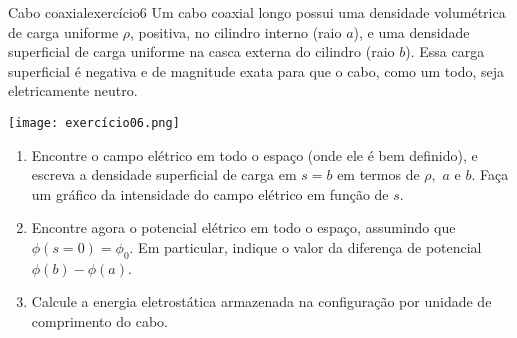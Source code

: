 \begin{exercício}{Cabo coaxial}{exercício6}
    Um cabo coaxial longo possui uma densidade volumétrica de carga uniforme \(\rho\), positiva, no cilindro interno (raio \(a\)), e uma densidade superficial de carga uniforme na casca externa do cilindro (raio \(b\)). Essa carga superficial é negativa e de magnitude exata para que o cabo, como um todo, seja eletricamente neutro.
    \begin{center}
        \texttt{[image: exercício06.png]}
    \end{center}
    \begin{enumerate}[label=(\alph*)]
        \item Encontre o campo elétrico em todo o espaço (onde ele é bem definido), e escreva a densidade superficial de carga em \(s = b\) em termos de \(\rho,\) \(a\) e \(b\). Faça um gráfico da intensidade do campo elétrico em função de \(s\).
        \item Encontre agora o potencial elétrico em todo o espaço, assumindo que \(\phi(s = 0) = \phi_0\). Em particular, indique o valor da diferença de potencial \(\phi(b) - \phi(a)\).
        \item Calcule a energia eletrostática armazenada na configuração por unidade de comprimento do cabo.
\end{enumerate}
\end{exercício}

